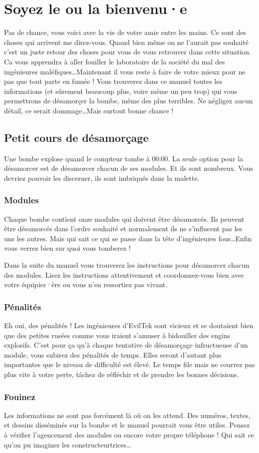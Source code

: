 \chapter{Soyez le ou la bienvenu·e}
Pas de chance, vous voici avec la vie de votre ami\md e entre les mains. Ce sont
des choses qui arrivent me direz-vous. Quand bien même on ne l'aurait pas
souhaité c'est un juste retour des choses pour vous de vous retrouver dans cette
situation. Ca vous apprendra à aller fouiller le laboratoire de la société du
mal des ingénieur\md e\md s maléfiques\dots  Maintenant il vous reste à faire de
votre mieux pour ne pas que tout parte en fumée ! Vous trouverez dans ce manuel
toutes les informations (et sûrement beaucoup plus, voire même un peu trop) qui
vous permettrons de désamorçer la bombe, même des plus terribles. Ne négligez
aucun détail, ce serait dommage\dots Mais surtout bonne chance !\par

\section{Petit cours de désamorçage}
Une bombe explose quand le compteur tombe à 00:00. La seule option pour la
désamorcer est de désamorcer chacun de ses modules. Et ils sont nombreux.
Vous devriez pouvoir les discerner, ils sont imbriqués dans la malette.
\subsection{Modules}
Chaque bombe contient onze modules qui doivent être désamorcés. Ils peuvent être
désamorcés dans l'ordre souhaité et normalement ils ne s'influcent pas les uns
les autres. Mais qui sait ce qui se passe dans la tête d'ingénieur\md e\md s
fous\dots Enfin vous verrez bien sur quoi vous tomberez !\par
Dans la suite du manuel vous trouverez les instructions pour désamorcer chacun
des modules. Lisez les instructions attentivement et coordonnez-vous bien avec
votre équipier·ère ou vous n'en ressortiez pas vivant.\par
\subsection{Pénalités}
Eh oui, des pénalités ! Les ingénieur\md e\md s d'EvilTek sont vicieux et se
doutaient bien que des petit\md e\md s rusé\md e\md s comme vous iraient s'amuser
à bidouiller des engins explosifs. C'est pour ça qu'à chaque tentative de
désamorçage infructueuse d'un module, vous subirez des pénalités de temps. Elles
seront d'autant plus importantes que le niveau de difficulté est élevé. Le temps
file mais ne courrez pas plus vite à votre perte, tâchez de réfléchir et de
prendre les bonnes décisions.\par
\subsection{Fouinez}
Les informations ne sont pas forcément là où on les attend. Des numéros, textes,
et dessins disséminés sur la bombe et le manuel pourrait vous être utiles.
Pensez à vérifier l'agencement des modules ou encore votre propre téléphone !
Qui sait ce qu'on pu imaginer les constructeur\md trice\md s\dots
